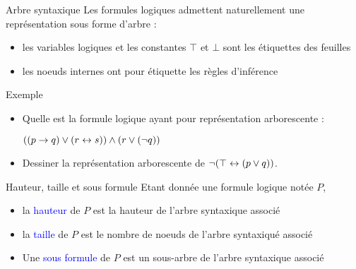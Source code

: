 \documentclass[10pt]{beamer}
\begin{document}
\begin{frame}{\Ctitle}{\stitle}
	\begin{block}{Arbre syntaxique}
		Les formules logiques admettent naturellement une représentation sous forme d'arbre :
		\begin{itemize}
			\item<2-> les variables logiques et les constantes $\top$ et $\bot$ sont les étiquettes des feuilles
			\item<3-> les noeuds internes ont pour étiquette les règles d'inférence
		\end{itemize}
	\end{block}
\end{frame}

\begin{frame}{\Ctitle}{\stitle}
	\begin{exampleblock}{Exemple}
		\begin{itemize}
			\item Quelle est la formule logique ayant pour représentation arborescente :
			      \begin{center}
			      \end{center}
			      \textcolor{OliveGreen}{$ ((p \to q) \vee (r \leftrightarrow s)) \wedge (r \vee (\neg q)) $}
			\item<3-> Dessiner la représentation arborescente de $ \neg(\top \leftrightarrow (p \vee q))$.
		\end{itemize}
	\end{exampleblock}
\end{frame}

\begin{frame}{\Ctitle}{\stitle}
	\begin{block}{Hauteur, taille et sous formule}
		Etant donnée une formule logique notée $P$,
		\begin{itemize}
			\item<2-> la \textcolor{blue}{hauteur} de $P$ est la hauteur de l'arbre syntaxique associé
			\item<3-> la \textcolor{blue}{taille} de $P$ est le nombre de noeuds de l'arbre syntaxiqué associé
			\item<4-> Une \textcolor{blue}{sous formule} de $P$ est un sous-arbre de l'arbre syntaxique associé
		\end{itemize}
	\end{block}
\end{frame}
\end{document}
